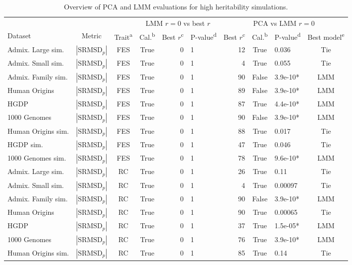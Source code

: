 \documentclass[9pt,lineno]{elife}
\newcommand{\rmsd}{\text{SRMSD}_p}
\begin{document}
\begin{table}
  \begin{fullwidth}
    \caption{Overview of PCA and LMM evaluations for high heritability simulations.}
    \label{tab:human_sum_pcs}
    \begin{tabular}{lcc|crl|rclc}
      \toprule
      & & & \multicolumn{3}{c|}{LMM $r=0$ vs best $r$} & \multicolumn{4}{c}{PCA vs LMM $r=0$} \\
      Dataset & Metric & {Trait\textsuperscript{a}} & {Cal.\textsuperscript{b}} & {Best $r$\textsuperscript{c}} & {P-value\textsuperscript{d}} & {Best $r$\textsuperscript{c}} & {Cal.\textsuperscript{b}} & {P-value\textsuperscript{d}} & {Best model\textsuperscript{e}} \\
      \midrule
      Admix. Large sim.	&$|\rmsd|$	&FES	&True	&0	&1	&12	&True	&0.036	&Tie \\
      Admix. Small sim.	&$|\rmsd|$	&FES	&True	&0	&1	&4	&True	&0.055	&Tie \\
      Admix. Family sim.	&$|\rmsd|$	&FES	&True	&0	&1	&90	&False	&3.9e-10*	&LMM \\
      Human Origins	&$|\rmsd|$	&FES	&True	&0	&1	&89	&False	&3.9e-10*	&LMM \\
      HGDP	&$|\rmsd|$	&FES	&True	&0	&1	&87	&True	&4.4e-10*	&LMM \\
      1000 Genomes	&$|\rmsd|$	&FES	&True	&0	&1	&90	&False	&3.9e-10*	&LMM \\
      Human Origins sim.	&$|\rmsd|$	&FES	&True	&0	&1	&88	&True	&0.017	&Tie \\
      HGDP sim.	&$|\rmsd|$	&FES	&True	&0	&1	&47	&True	&0.046	&Tie \\
      1000 Genomes sim.	&$|\rmsd|$	&FES	&True	&0	&1	&78	&True	&9.6e-10*	&LMM \\
      Admix. Large sim.	&$|\rmsd|$	&RC	&True	&0	&1	&26	&True	&0.11	&Tie \\
      Admix. Small sim.	&$|\rmsd|$	&RC	&True	&0	&1	&4	&True	&0.00097	&Tie \\
      Admix. Family sim.	&$|\rmsd|$	&RC	&True	&0	&1	&90	&False	&3.9e-10*	&LMM \\
      Human Origins	&$|\rmsd|$	&RC	&True	&0	&1	&90	&True	&0.00065	&Tie \\
      HGDP	&$|\rmsd|$	&RC	&True	&0	&1	&37	&True	&1.5e-05*	&LMM \\
      1000 Genomes	&$|\rmsd|$	&RC	&True	&0	&1	&76	&True	&3.9e-10*	&LMM \\
      Human Origins sim.	&$|\rmsd|$	&RC	&True	&0	&1	&85	&True	&0.14	&Tie \\

\end{tabular}
\end{fullwidth}
\end{table}
\end{document}
